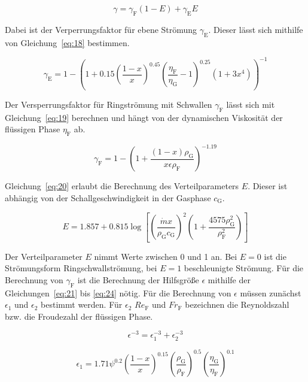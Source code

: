 \begin{equation}
\label{eq:17}
\gamma = \gamma_\mathrm{F}(1-E) + \gamma_\mathrm{E} E
\end{equation}

Dabei ist der Verperrungsfaktor für ebene Strömung $\gamma_\mathrm{E}$. Dieser lässt sich mithilfe von Gleichung~\ref{eq:18} bestimmen.

\begin{equation}
\label{eq:18}
\gamma_\mathrm{E} = 1 - \left( 1+0.15 \left( \frac{1-x}{x} \right)^{0.45} \left( \frac{\eta_\mathrm{F}}{\eta_\mathrm{G}}-1 \right)^{0.25} (1 + 3x^4)\right)^{-1}
\end{equation}


Der Versperrungsfaktor für Ringströmung mit Schwallen $\gamma_\mathrm{F}$ lässt sich mit Gleichung~\ref{eq:19} berechnen und hängt von der dynamischen Viskosität der flüssigen Phase $\eta_\mathrm{F}$ ab.

\begin{equation}
\label{eq:19}
\gamma_\mathrm{F} = 1 - \left(1+\frac{(1-x)\rho_\mathrm{G}}{x \epsilon \rho_\mathrm{F}}\right)^{-1.19}
\end{equation}


Gleichung~\ref{eq:20} erlaubt die Berechnung des Verteilparameters $E$. Dieser ist abhängig von der Schallgeschwindigkeit in der Gasphase $c_\mathrm{G}$.

\begin{equation}
\label{eq:20}
E = 1.857 + 0.815 \log\left[\left(\frac{\dot{m} x}{\rho_\mathrm{G} c_\mathrm{G}}\right)^2 \left( 1+ \frac{4575 \rho_\mathrm{G}^2}{\rho_\mathrm{F}^2} \right)\right]
\end{equation}

Der Verteilparameter $E$ nimmt Werte zwischen 0 und 1 an. Bei $E=0$ ist die Strömungsform Ringschwallströmung, bei $E=1$ beschleunigte Strömung.
Für die Berechnung von $\gamma_\mathrm{F}$ ist die Berechnung der Hilfsgröße $\epsilon$ mithilfe der Gleichungen~\ref{eq:21} bis \ref{eq:24} nötig. Für die Berechnung von $\epsilon$ müssen zunächst $\epsilon_1$ und $\epsilon_2$ bestimmt werden. Für $\epsilon_2$ $Re_\mathrm{F}$ und $Fr_\mathrm{F}$ bezeichnen die Reynoldszahl bzw. die Froudezahl der flüssigen Phase.

\begin{equation}
\label{eq:21}
\epsilon^{-3} = \epsilon_1^{-3} + \epsilon_2^{-3}
\end{equation}

\begin{equation}
\label{eq:22}
\epsilon_1 = 1.71 \psi^{0.2} \left( \frac{1-x}{x} \right)^{0.15} \left( \frac{\rho_\mathrm{G}}{\rho_\mathrm{F}} \right)^{0.5} \left( \frac{\eta_\mathrm{G}}{\eta_\mathrm{F}} \right)^{0.1}
\end{equation}

